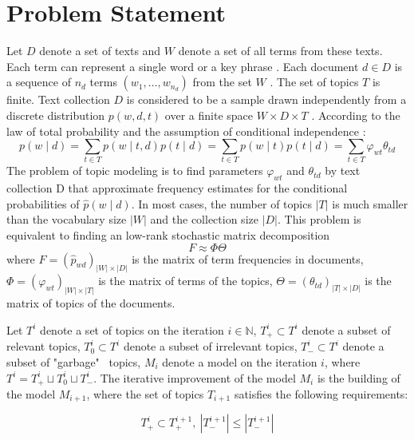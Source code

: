 \documentclass{article}
\begin{document}
\section{Problem Statement}

Let $D$ denote a set of texts and $W$ denote a set of all terms from these texts.
Each term can represent a single word or a key phrase \citep{artm2}.
Each document $d \in D$ is a sequence of $n_d$ terms $\left( w_1, \dots, w_{n_d} \right)$ from the set $W$ \citep{artm}.
The set of topics $T$ is finite.
Text collection $D$ is considered to be a sample drawn independently from a discrete distribution $p(w, d, t)$ over a finite space $W \times D \times T$ \citep{artm2}.
According to the law of total probability and the assumption of conditional independence \citep{bigartm}:
 \begin{equation}
      p(w \mid d) = \sum \limits_{t \in T} p(w \mid t, d) p(t \mid d) = \sum \limits_{t \in T} p (w \mid t) p (t \mid d) = \sum \limits_{t \in T} \varphi_{wt} \theta_{td}
 \end{equation}
The problem of topic modeling is to find parameters $\varphi_{wt}$ and $\theta_{td}$ by text collection D that approximate frequency estimates for the conditional probabilities of $\widehat{p} (w \mid d)$.
In most cases, the number of topics $|T|$ is much smaller than the vocabulary size $|W|$ and the collection size $|D|$. This problem is equivalent to finding an low-rank stochastic matrix decomposition \citep{artm2}
\begin{equation}
     F \approx \Phi \Theta
\end{equation}
where $F = {(\widehat{p}_{wd})}_{|W| \times |D|}$ is the matrix of term frequencies in documents, $\Phi = {(\varphi_{wt})}_{|W| \times |T|}$ is the matrix of terms of the topics, $\Theta = {(\theta_{td})}_{|T| \times |D|}$ is the matrix of topics of the documents.

Let $T^i$ denote a set of topics on the iteration $i \in \mathbb{N}$,  $T_+^i \subset T^i$ denote a subset of relevant topics, $T_0^i \subset T^i$ denote a subset of irrelevant topics, $T_-^i \subset T^i$ denote a subset of "garbage" \ topics, $M_i$ denote a model on the iteration $i$, where $T^i = T_+^i \sqcup T_0^i \sqcup T_-^i$.
The iterative improvement of the model $M_i$ is the building of the model  $M_{i + 1}$, where the set of topics $T_{i + 1}$ satisfies the following requirements:

$$T_+^i \subset T_+^{i + 1}, \ \left| T_-^{i + 1} \right| \leq \left| T_-^{i + 1} \right|$$
\end{document}
